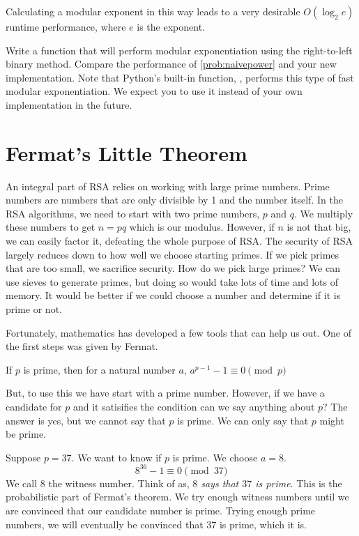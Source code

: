 Calculating a modular exponent in this way leads to a very desirable $O(\log_2 e)$ runtime performance, where $e$ is the exponent.

\begin{problem}
Write a function that will perform modular exponentiation using the right-to-left binary method.
Compare the performance of \ref{prob:naivepower} and your new implementation.
Note that Python's built-in function, , performs this type of fast modular exponentiation.
We expect you to use it instead of your own implementation in the future.
\label{prob:rlbpower}
\end{problem}

\section*{Fermat's Little Theorem}
An integral part of RSA relies on working with large prime numbers.
Prime numbers are numbers that are only divisible by 1 and the number itself.
In the RSA algorithms, we need to start with two prime numbers, $p$ and $q$.
We multiply these numbers to get $n=pq$ which is our modulus.
However, if $n$ is not that big, we can easily factor it, defeating the whole purpose of RSA.
The security of RSA largely reduces down to how well we choose starting primes.
If we pick primes that are too small, we sacrifice security.
How do we pick large primes?
We can use sieves to generate primes, but doing so would take lots of time and lots of memory.
It would be better if we could choose a number and determine if it is prime or not.

Fortunately, mathematics has developed a few tools that can help us out.
One of the first steps was given by Fermat.
\begin{theorem}
If $p$ is prime, then for a natural number $a$, $a^{p-1} - 1 \equiv 0 \pmod{p}$
\end{theorem}
But, to use this we have start with a prime number.
However, if we have a candidate for $p$ and it satisifies the condition can we say anything about $p$?
The answer is yes, but we cannot say that $p$ is prime.
We can only say that $p$ might be prime.
\begin{example}
Suppose $p=37$.
We want to know if $p$ is prime.  We choose $a=8$.
\[
8^{36} - 1 \equiv 0 \pmod{37} 
\]
We call $8$ the witness number.  Think of as, \emph{$8$ says that $37$ is prime}.
This is the probabilistic part of Fermat's theorem.
We try enough witness numbers until we are convinced that our candidate number is prime.
Trying enough prime numbers, we will eventually be convinced that $37$ is prime, which it is.
\end{example}

